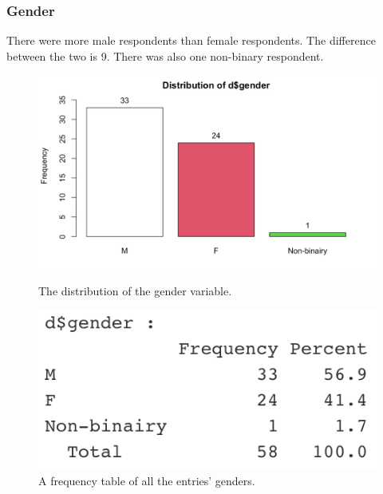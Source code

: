 \subsubsection{Gender}
There were more male respondents than female respondents. The difference between the two is 9. There was also one non-binary respondent.
\begin{figure}[!htb]
	\includegraphics[width=\linewidth]{../LaTeX/Figures/Environments/GenderPlot.png}
	\caption{The distribution of the gender variable.}\label{fig:genderPlot}
	\endminipage\hfill
	\includegraphics[width=\linewidth]{../LaTeX/Figures/Environments/GenderFreq.png}
	\caption{A frequency table of all the entries' genders.}\label{fig:genderFreq}
	\endminipage\hfill
\end{figure}

